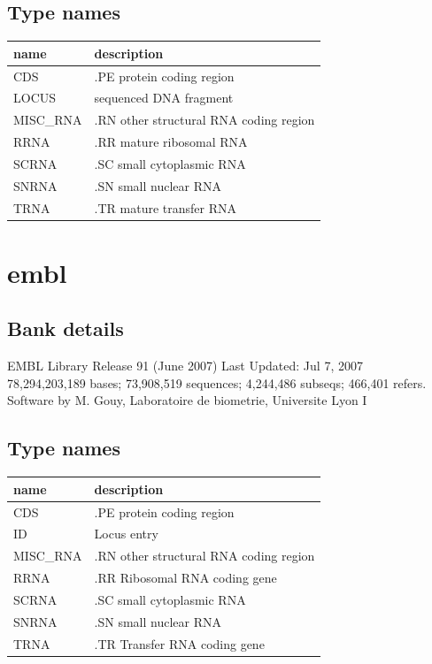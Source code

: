 \documentclass{article}
\begin{document}
\begin{Schunk}
\subsection{Type names}
\noindent\begin{tabular}{ll}
\hline \hline
name & description\\
\hline
CDS & .PE protein coding region \\
LOCUS & sequenced DNA fragment \\
MISC\_RNA & .RN other structural RNA coding region \\
RRNA & .RR mature ribosomal RNA \\
SCRNA & .SC small cytoplasmic RNA \\
SNRNA & .SN small nuclear RNA \\
TRNA & .TR mature transfer RNA \\
\hline \hline
\end{tabular}

\section{ embl }
\subsection{Bank details}
EMBL Library Release 91 (June 2007) Last Updated: Jul  7, 2007\\
78,294,203,189 bases; 73,908,519 sequences; 4,244,486 subseqs; 466,401 refers.\\
Software by M. Gouy, Laboratoire de biometrie, Universite Lyon I

\subsection{Type names}
\noindent\begin{tabular}{ll}
\hline \hline
name & description\\
\hline
CDS & .PE protein coding region \\
ID & Locus entry \\
MISC\_RNA & .RN other structural RNA coding region \\
RRNA & .RR Ribosomal RNA coding gene \\
SCRNA & .SC small cytoplasmic RNA \\
SNRNA & .SN small nuclear RNA \\
TRNA & .TR Transfer RNA coding gene \\
\hline \hline
\end{tabular}


\end{Schunk}
\end{document}
